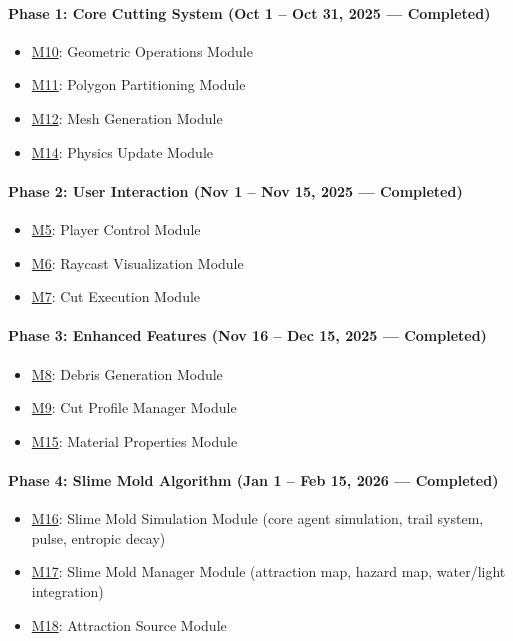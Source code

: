 \documentclass[12pt, titlepage]{article}
\begin{document}
\paragraph{Phase 1: Core Cutting System (Oct 1 -- Oct 31, 2025 --- Completed)}
\begin{itemize}
\item \hyperref[M10]{M10}: Geometric Operations Module
\item \hyperref[M11]{M11}: Polygon Partitioning Module
\item \hyperref[M12]{M12}: Mesh Generation Module
\item \hyperref[M14]{M14}: Physics Update Module
\end{itemize}

\paragraph{Phase 2: User Interaction (Nov 1 -- Nov 15, 2025 --- Completed)}
\begin{itemize}
\item \hyperref[M5]{M5}: Player Control Module
\item \hyperref[M6]{M6}: Raycast Visualization Module
\item \hyperref[M7]{M7}: Cut Execution Module
\end{itemize}

\paragraph{Phase 3: Enhanced Features (Nov 16 -- Dec 15, 2025 --- Completed)}
\begin{itemize}
\item \hyperref[M8]{M8}: Debris Generation Module
\item \hyperref[M9]{M9}: Cut Profile Manager Module
\item \hyperref[M15]{M15}: Material Properties Module
\end{itemize}

\paragraph{Phase 4: Slime Mold Algorithm (Jan 1 -- Feb 15, 2026 --- Completed)}
\begin{itemize}
\item \hyperref[M16]{M16}: Slime Mold Simulation Module (core agent simulation, trail system, pulse, entropic decay)
\item \hyperref[M17]{M17}: Slime Mold Manager Module (attraction map, hazard map, water/light integration)
\item \hyperref[M18]{M18}: Attraction Source Module
\end{itemize}
\end{document}
